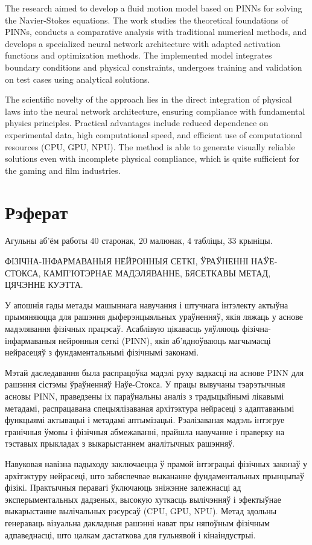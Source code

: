 The research aimed 
to develop a fluid motion model based on PINNs for solving the Navier-Stokes equations. 
The work studies the theoretical foundations of PINNs, conducts a 
comparative analysis with traditional numerical methods, and develops a specialized 
neural network architecture with adapted activation functions and optimization methods. 
The implemented model integrates boundary conditions and physical constraints, undergoes training 
and validation on test cases using analytical solutions. 

The scientific novelty of the approach lies in the direct integration of physical laws into the 
neural network architecture, ensuring compliance with fundamental physics principles. Practical 
advantages include reduced dependence on experimental data, high computational speed, 
and efficient use of computational resources (CPU, GPU, NPU). 
The method is able to generate visually reliable solutions even with incomplete physical
compliance, which is quite sufficient for the gaming and film industries.

\chapter*{Рэферат}
Агульны аб'ём работы $40$ старонак, $20$ малюнак, $4$ табліцы, $33$ крыніцы.

ФІЗІЧНА-ІНФАРМАВАНЫЯ НЕЙРОННЫЯ СЕТКІ, ЎРАЎНЕННІ НАЎЕ-СТОКСА, 
КАМП'ЮТЭРНАЕ МАДЭЛЯВАННЕ, БЯСЕТКАВЫ МЕТАД, ЦЯЧЭННЕ КУЭТТА.

У апошнія гады метады машыннага навучання і штучнага інтэлекту актыўна прымяняюцца 
для рашэння дыферэнцыяльных ураўненняў, якія ляжаць у аснове мадэлявання фізічных працэсаў. 
Асаблівую цікавасць уяўляюць фізічна-інфармаваныя нейронныя сеткі (PINN), якія 
аб'ядноўваюць магчымасці нейрасецяў з фундаментальнымі фізічнымі законамі.

Мэтай даследавання 
была распрацоўка мадэлі руху вадкасці на аснове PINN для рашэння сістэмы ўраўненняў Наўе-Стокса. 
У працы вывучаны тэарэтычныя асновы PINN, праведзены іх 
параўнальны аналіз з традыцыйнымі лікавымі метадамі, распрацавана спецыялізаваная 
архітэктура нейрасеці з адаптаванымі функцыямі актывацыі і метадамі аптымізацыі. 
Рэалізаваная мадэль інтэгруе гранічныя ўмовы і фізічныя абмежаванні, прайшла навучанне 
і праверку на тэставых прыкладах з выкарыстаннем аналітычных рашэнняў. 

Навуковая навізна падыходу заключаецца ў прамой інтэграцыі фізічных законаў у архітэктуру 
нейрасеці, што забяспечвае выкананне фундаментальных прынцыпаў фізікі. Практычныя 
перавагі ўключаюць зніжэнне залежнасці ад эксперыментальных дадзеных, высокую хуткасць 
вылічэнняў і эфектыўнае выкарыстанне вылічальных рэсурсаў (CPU, GPU, NPU). 
Метад здольны генераваць візуальна дакладныя рашэнні нават пры няпоўным фізічным
адпаведнасці, што цалкам дастаткова для гульнявой і кінаіндустрыі.

